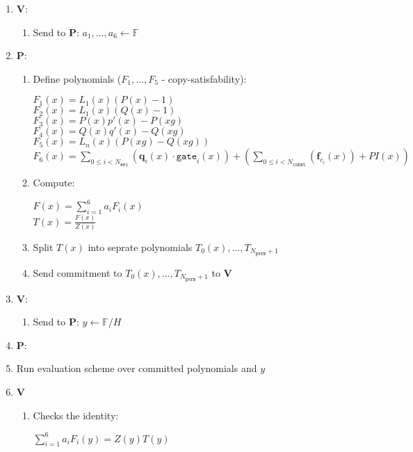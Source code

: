 \begin{enumerate}
	\item \textbf{V}:
	\begin{enumerate}
		\item Send to \textbf{P}: $a_1, \dots, a_6 \leftarrow \mathbb{F}$
	\end{enumerate}
	\item \textbf{P}:
	\begin{enumerate}
		\item Define polynomials ($F_1, \dots, F_5$ - copy-satisfability):
		\begin{center}
			$F_1(x) = L_1(x)(P(x) - 1)$\\
			$F_2(x) = L_1(x)(Q(x) - 1)$ \\
			$F_3(x) = P(x)p'(x) - P(xg)$ \\
			$F_4(x) = Q(x)q'(x) - Q(xg)$ \\
			$F_5(x) = L_n(x)(P(xg) - Q(xg))$ \\
			$F_6(x) = \sum\limits_{0 \leq i < N_{\texttt{sel}}} (\textbf{q}_{i}(x) \cdot \texttt{gate}_i(x))
				+ (\sum\limits_{0 \leq i < N_{\texttt{const}}}(\textbf{f}_{c_i}(x)) + PI(x))$
		\end{center}
		\item Compute:
		\begin{center}
			$F(x) = \sum\limits_{i = 1}^6 a_iF_i(x)$ \\
			$T(x) = \frac{F(x)}{Z(x)}$
		\end{center}
		\item Split $T(x)$ into seprate polynomials $T_0(x), ..., T_{N_{\texttt{perm}} + 1}$
		\item Send commitment to $T_0(x), ..., T_{N_{\texttt{perm}} + 1}$ to \textbf{V}
	\end{enumerate}
	\item \textbf{V}:
	\begin{enumerate}
		\item Send to \textbf{P}: $y \leftarrow \mathbb{F}/H$
	\end{enumerate}
	\item \textbf{P}:
		\item Run evaluation scheme over committed polynomials and $y$
	\item \textbf{V}
	\begin{enumerate}
		\item Checks the identity:
		\begin{center}
			$\sum\limits_{i = 1}^6a_iF_i(y) = Z(y)T(y)$
		\end{center}
	\end{enumerate}
\end{enumerate}